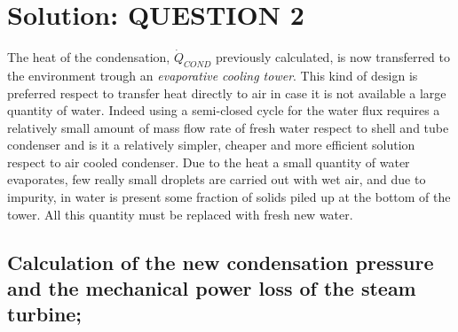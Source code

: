 \documentclass[a4paper,12pt]{article}
\begin{document}
\section{Solution: QUESTION 2}
The heat of the condensation, $\dot{Q}_{COND}$ previously calculated, is now transferred to the environment trough an \emph{evaporative cooling tower}. This kind of design is preferred respect to transfer heat directly to air in case it is not available a large quantity of water. Indeed using a semi-closed cycle for the water flux requires a relatively small amount of mass flow rate of fresh water respect to shell and tube condenser and is it a relatively simpler, cheaper and more efficient solution respect to air cooled condenser. 
Due to the heat a small quantity of water evaporates, few really small droplets are carried out with wet air, and due to impurity, in water is present some fraction of solids piled up at the bottom of the tower. All this quantity must be replaced with fresh new water. 

\subsection{Calculation of the new condensation pressure and the mechanical power loss of the steam turbine;}
\end{document}
